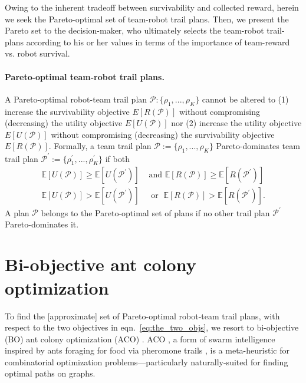 \documentclass[11pt, oneside]{article}
\begin{document}
Owing to the inherent tradeoff between survivability and collected reward, herein we seek the Pareto-optimal set of team-robot trail plans. Then, we present the Pareto set to the decision-maker, who ultimately selects the team-robot trail-plans according to his or her values in terms of the importance of team-reward vs. robot survival. 

\paragraph{Pareto-optimal team-robot trail plans.} 
A Pareto-optimal robot-team trail plan $\mathcal{P}:\{\rho_1, ..., \rho_K\}$ cannot be altered to
(1) increase the survivability objective $E[R(\mathcal{P})]$ without compromising (decreasing) the utility objective $E[U(\mathcal{P})]$
nor
(2) increase the utility objective $E[U(\mathcal{P})]$ without compromising (decreasing) the survivability objective $E[R(\mathcal{P})]$.
Formally, a team trail plan $\mathcal{P}:=\{\rho_1, ..., \rho_K\}$ Pareto-dominates team trail plan  $\mathcal{P}^\prime :=\{\rho_1^\prime, ..., \rho_K^\prime\}$ if both
\begin{align}
	\mathbb{E}[U(\mathcal{P})] \geq \mathbb{E}[U(\mathcal{P}^\prime)] & \text{ and }  \mathbb{E}[R(\mathcal{P})] \geq \mathbb{E}[R(\mathcal{P}^\prime)] \\
	\mathbb{E}[U(\mathcal{P})] > \mathbb{E}[U(\mathcal{P}^\prime)] & \; \text{ or   } \; \mathbb{E}[R(\mathcal{P})] > \mathbb{E}[R(\mathcal{P}^\prime)].
\end{align}
A plan $\mathcal{P}$ belongs to the Pareto-optimal set of plans if no other trail plan $\mathcal{P}^\prime$ Pareto-dominates it.



\section{Bi-objective ant colony optimization}
To find the [approximate] set of Pareto-optimal robot-team trail plans, with respect to the two objectives in eqn.~\ref{eq:the_two_objs}, we resort to bi-objective (BO) ant colony optimization (ACO) \cite{iredi2001bi}. 
ACO \cite{dorigo2006ant}, a form of swarm intelligence \cite{bonabeau1999swarm} inspired by ants foraging for food via pheromone trails \cite{bonabeau2000inspiration}, is a meta-heuristic for combinatorial optimization problems---particularly naturally-suited for finding optimal paths on graphs. 
\end{document}
